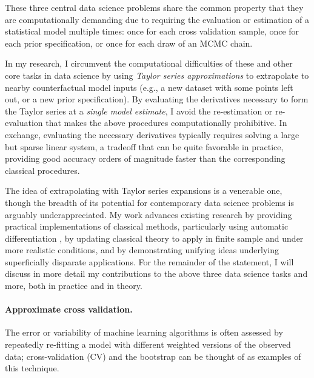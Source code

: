 
These three central data science problems share the common property that they
are computationally demanding due to requiring the evaluation or estimation of a
statistical model multiple times: once for each cross validation sample, once
for each prior specification, or once for each draw of an MCMC chain.

In my research, I circumvent the computational difficulties of these and other
core tasks in data science by using {\em Taylor series approximations} to
extrapolate to nearby counterfactual model inputs (e.g., a new dataset with some
points left out, or a new prior specification). By evaluating the derivatives
necessary to form the Taylor series at a {\em single model estimate}, I avoid
the re-estimation or re-evaluation that makes the above procedures
computationally prohibitive.  In exchange, evaluating the necessary derivatives
typically requires solving a large but sparse linear system, a tradeoff that can
be quite favorable in practice, providing good accuracy orders of magnitude
faster than the corresponding classical procedures.

The idea of extrapolating with Taylor series expansions is a venerable one,
though the breadth of its potential for contemporary data science problems is
arguably underappreciated. My work advances existing research by providing
practical implementations of classical methods, particularly using automatic
differentiation \citep{baydin:2015:automatic}, by updating classical theory to
apply in finite sample and under more realistic conditions, and by demonstrating
unifying ideas underlying superficially disparate applications. For the
remainder of the statement, I will discuss in more detail my contributions to
the above three data science tasks and more, both in practice and in theory.




\newpage

\paragraph{Approximate cross validation.}

The error or variability of machine learning algorithms is often assessed by
repeatedly re-fitting a model with different weighted versions of the observed
data; cross-validation (CV) and the bootstrap can be thought of as examples of
this technique.

